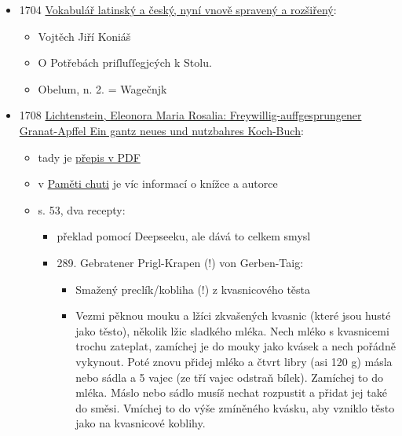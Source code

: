 \begin{itemize}
\tightlist
\item
  1704
  \href{https://bara.ujc.cas.cz/slovniky/vokabular/vokabular12.html}{Vokabulář
  latinský a český, nyní vnově spravený a rozšiřený}:

  \begin{itemize}
  \tightlist
  \item
    Vojtěch Jiří Koniáš
  \item
    O Potřebách priſluſſegjcých k Stolu.
  \item
    Obelum, n. 2. = Wagečnjk
  \end{itemize}
\item
  1708
  \href{https://unipub.uni-graz.at/obvugrdomus_druck/content/titleinfo/8109092}{Lichtenstein,
  Eleonora Maria Rosalia: Freywillig-auffgesprungener Granat-Apffel Ein
  gantz neues und nutzbahres Koch-Buch}:

  \begin{itemize}
  \tightlist
  \item
    tady je
    \href{https://unipub.uni-graz.at/download/pdf/8109092.pdf\#page=54}{přepis
    v PDF}
  \item
    v
    \href{https://kulturni-dejiny.slu.cz/data/uploads/067/upvysledky/pamet_chuti_odborna-kniha_uplatnny_2020.pdf\#page=133}{Paměti
    chuti} je víc informací o knížce a autorce
  \item
    s. 53, dva recepty:

    \begin{itemize}
    \tightlist
    \item
      překlad pomocí Deepseeku, ale dává to celkem smysl
    \item
      289. Gebratener Prigl-Krapen (!) von Gerben-Taig:

      \begin{itemize}
      \tightlist
      \item
        Smažený preclík/kobliha (!) z kvasnicového těsta
      \item
        Vezmi pěknou mouku a lžíci zkvašených kvasnic (které jsou husté
        jako těsto), několik lžic sladkého mléka. Nech mléko s
        kvasnicemi trochu zateplat, zamíchej je do mouky jako kvásek a
        nech pořádně vykynout. Poté znovu přidej mléko a čtvrt libry
        (asi 120 g) másla nebo sádla a 5 vajec (ze tří vajec odstraň
        bílek). Zamíchej to do mléka. Máslo nebo sádlo musíš nechat
        rozpustit a přidat jej také do směsi. Vmíchej to do výše
        zmíněného kvásku, aby vzniklo těsto jako na kvasnicové koblihy.
      \end{itemize}
    \end{itemize}
  \end{itemize}
\end{itemize}

